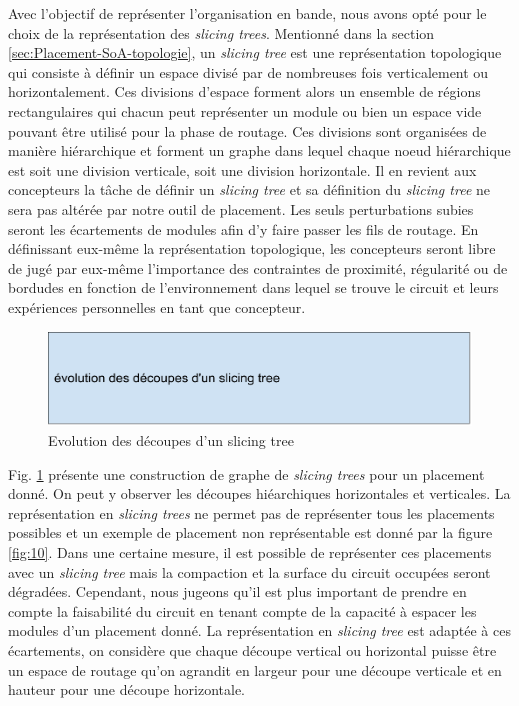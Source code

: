 Avec l'objectif de représenter l'organisation en bande, nous avons opté pour le choix de la représentation des \textit{slicing trees}. Mentionné dans la section \ref{sec:Placement-SoA-topologie}, un \textit{slicing tree} est une représentation topologique qui consiste à définir un espace divisé par de nombreuses fois verticalement ou horizontalement. Ces divisions d'espace forment alors un ensemble de régions rectangulaires qui chacun peut représenter un module ou bien un espace vide pouvant être utilisé pour la phase de routage. Ces divisions sont organisées de manière hiérarchique et forment un graphe dans lequel chaque noeud hiérarchique est soit une division verticale, soit une division horizontale. Il en revient aux concepteurs la tâche de définir un \textit{slicing tree} et sa définition du \textit{slicing tree} ne sera pas altérée par notre outil de placement. Les seuls perturbations subies seront les écartements de modules afin d'y faire passer les fils de routage. En définissant eux-même la représentation topologique, les concepteurs seront libre de jugé par eux-même l'importance des contraintes de proximité, régularité ou de bordudes en fonction de l'environnement dans lequel se trouve le circuit et leurs expériences personnelles en tant que concepteur.\newline
\begin{figure}[h]
\begin{center}
\includegraphics[height=0.10\textheight]{Figures/9.pdf}
\caption{Evolution des découpes d'un slicing tree}
\label{fig:9}
\end{center}
\end{figure}\newline
\indent Fig. \ref{fig:9} présente une construction de graphe de \textit{slicing trees} pour un placement donné. On peut y observer les découpes hiéarchiques horizontales et verticales. La représentation en \textit{slicing trees} ne permet pas de représenter tous les placements possibles et un exemple de placement non représentable est donné par la figure \ref{fig:10}. Dans une certaine mesure, il est possible de représenter ces placements avec un \textit{slicing tree} mais la compaction et la surface du circuit occupées seront dégradées. Cependant, nous jugeons qu'il est plus important de prendre en compte la faisabilité du circuit en tenant compte de la capacité à espacer les modules d'un placement donné. La représentation en \textit{slicing tree} est adaptée à ces écartements, on considère que chaque découpe vertical ou horizontal puisse être un espace de routage qu'on agrandit en largeur pour une découpe verticale et en hauteur pour une découpe horizontale. \newline

